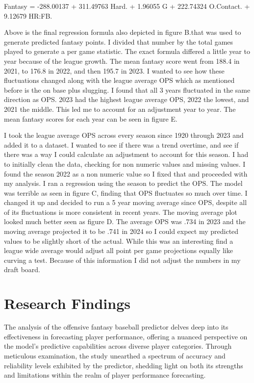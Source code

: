 \documentclass[12pt, english]{article}
\begin{document}
Fantasy = -288.00137 + 311.49763 \times Hard. + 1.96055 \times G + 222.74324 \times O.Contact. + 9.12679 \times HR:FB.

Above is the final regression formula also depicted in figure B.that was used to generate predicted fantasy points. I divided that number by the total games played to generate a per game statistic. The exact formula differed a little year to year because of the league growth. The mean fantasy score went from 188.4 in 2021, to 176.8 in 2022, and then 195.7 in 2023. I wanted to see how these fluctuations changed along with the league average OPS which as mentioned before is the on base plus slugging. I found that all 3 years fluctuated in the same direction as OPS. 2023 had the highest league average OPS, 2022 the lowest, and 2021 the middle. This led me to account for an adjustment year to year. The mean fantasy scores for each year can be seen in figure E.

I took the league average OPS across every season since 1920 through 2023 and added it to a dataset. I wanted to see if there was a trend overtime, and see if there was a way I could calculate an adjustment to account for this season. I had to initially clean the data, checking for non numeric values and missing values. I found the season 2022 as a non numeric value so I fixed that and proceeded with my analysis. I ran a regression using the season to predict the OPS. The model was terrible as seen in figure C, finding that OPS fluctuates so much over time. I changed it up and decided to run a 5 year moving average since OPS, despite all of its fluctuations is more consistent in recent years. The moving average plot looked much better seen as figure D. The average OPS was .734 in 2023 and the moving average projected it to be .741 in 2024 so I could expect my predicted values to be slightly short of the actual. While this was an interesting find a league wide average would adjust all point per game projections equally like curving a test. Because of this information I did not adjust the numbers in my draft board.

\section{Research Findings}

The analysis of the offensive fantasy baseball predictor delves deep into its effectiveness in forecasting player performance, offering a nuanced perspective on the model's predictive capabilities across diverse player categories. Through meticulous examination, the study unearthed a spectrum of accuracy and reliability levels exhibited by the predictor, shedding light on both its strengths and limitations within the realm of player performance forecasting.
\end{document}
